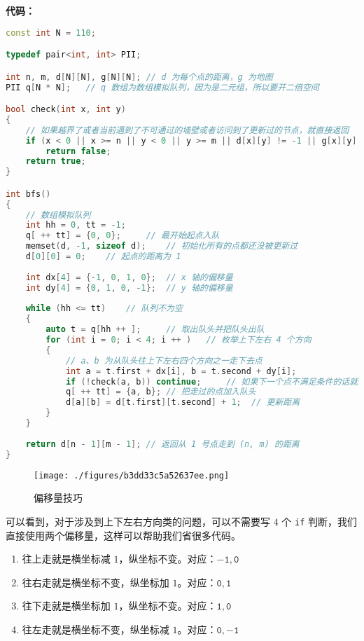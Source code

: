 \textbf{代码：}
\begin{lstlisting}[language=cpp]
const int N = 110;

typedef pair<int, int> PII;

int n, m, d[N][N], g[N][N]; // d 为每个点的距离，g 为地图
PII q[N * N];   // q 数组为数组模拟队列，因为是二元组，所以要开二倍空间

bool check(int x, int y)
{
    // 如果越界了或者当前遇到了不可通过的墙壁或者访问到了更新过的节点，就直接返回
    if (x < 0 || x >= n || y < 0 || y >= m || d[x][y] != -1 || g[x][y] == 1) 
        return false;
    return true;
}

int bfs()
{
    // 数组模拟队列
    int hh = 0, tt = -1;
    q[ ++ tt] = {0, 0};     // 最开始起点入队
    memset(d, -1, sizeof d);    // 初始化所有的点都还没被更新过
    d[0][0] = 0;    // 起点的距离为 1
    
    int dx[4] = {-1, 0, 1, 0};  // x 轴的偏移量
    int dy[4] = {0, 1, 0, -1};  // y 轴的偏移量
    
    while (hh <= tt)    // 队列不为空
    {
        auto t = q[hh ++ ];     // 取出队头并把队头出队
        for (int i = 0; i < 4; i ++ )   // 枚举上下左右 4 个方向
        {
            // a、b 为从队头往上下左右四个方向之一走下去点
            int a = t.first + dx[i], b = t.second + dy[i];   
            if (!check(a, b)) continue;     // 如果下一个点不满足条件的话就往下一个方向走
            q[ ++ tt] = {a, b}; // 把走过的点加入队头
            d[a][b] = d[t.first][t.second] + 1;  // 更新距离
        }
    }
    
    return d[n - 1][m - 1]; // 返回从 1 号点走到 (n, m) 的距离
}  
\end{lstlisting}

\begin{figure}[ht]
\centering
\texttt{[image: ./figures/b3dd33c5a52637ee.png]}
\caption{偏移量技巧} \label{fig_BFS_7}
\end{figure}

可以看到，对于涉及到上下左右方向类的问题，可以不需要写 $4$ 个 \verb|if| 判断，我们直接使用两个偏移量，这样可以帮助我们省很多代码。

\begin{enumerate}
\item 往上走就是横坐标减 $1$，纵坐标不变。对应：$\mathtt{-1, 0}$
\item 往右走就是横坐标不变，纵坐标加 $1$。对应：$\mathtt{0, 1}$
\item 往下走就是横坐标加 $1$，纵坐标不变。对应：$\mathtt{1, 0}$
\item 往左走就是横坐标不变，纵坐标减 $1$。对应：$\mathtt{0, -1}$
\end{enumerate}

